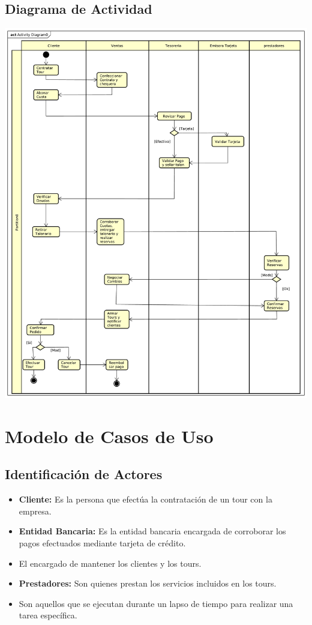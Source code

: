 \documentclass[12pt,a4paper]{article}
\begin{document}
	\newpage
	\subsection{Diagrama de Actividad}
		\includegraphics[scale=0.45]{images/Activity_Diagram0.pdf}

\newpage
\section{Modelo de Casos de Uso}
	\subsection{Identificación de Actores}
		\begin{itemize}
			\item \textbf{Cliente:} Es la persona que efectúa la contratación de un tour con la empresa.
			\item \textbf{Entidad Bancaria:} Es la entidad bancaria encargada de corroborar los pagos efectuados mediante tarjeta de crédito.
			\item {} El encargado de mantener los clientes y los tours.
			\item \textbf{Prestadores:} Son quienes prestan los servicios incluidos en los tours.
			\item {} Son aquellos que se ejecutan durante un lapso de tiempo para realizar una tarea específica.
		\end{itemize}
\end{document}
